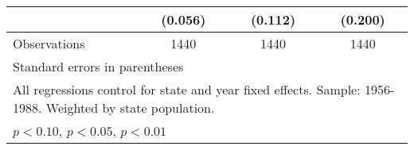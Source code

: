 \begin{table}[htbp]
\begin{tabular}{l*{3}{c}}
                    &     (0.056)         &     (0.112)         &     (0.200)         \\
\midrule
Observations        &        1440         &        1440         &        1440         \\
\bottomrule
\multicolumn{4}{l}{\footnotesize Standard errors in parentheses}\\
\multicolumn{4}{l}{\footnotesize All regressions control for state and year fixed effects. Sample: 1956-1988. Weighted by state population.}\\
\multicolumn{4}{l}{\footnotesize \sym{*} \(p<0.10\), \sym{**} \(p<0.05\), \sym{***} \(p<0.01\)}\\
\end{tabular}
\end{table}
